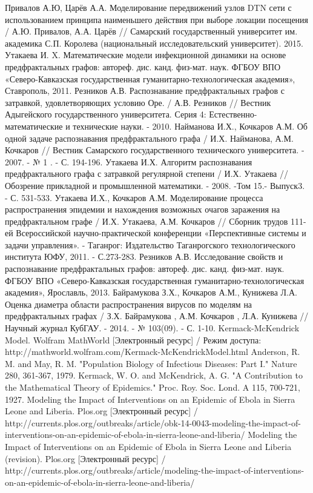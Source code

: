 \begin{thebibliography}{}
	 Привалов А.Ю, Царёв А.А. Моделирование передвижений узлов DTN сети с использованием принципа наименьшего действия при выборе локации посещения / А.Ю. Привалов, А.А. Царёв // Самарский государственный университет им. академика С.П. Королева (национальный исследовательский университет). 2015.
	Утакаева И. X. Математические модели	инфекционной динамики	на основе	предфрактальных графов: автореф. дис.  канд. физ-мат. наук.  ФГБОУ ВПО «Северо-Кавказская	государственная гуманитарно-технологическая академия», Ставрополь, 2011.
	Резников А.В. Распознавание предфрактальных графов с затравкой, удовлетворяющих условию Оре. / А.В. Резников // Вестник Адыгейского государственного университета. Серия 4: Естественно-математические и технические науки. - 2010.
	  Найманова И.Х., Кочкаров А.М. Об одной задаче распознавания предфрактального графа / И.Х. Найманова, А.М. Кочкаров // Вестник Самарского государственного технического университета. - 2007. - № 1 . - С. 194-196.
	Утакаева И.Х. Алгоритм распознавания предфрактального графа с затравкой регулярной степени / И.Х. Утакаева // Обозрение прикладной и промышленной математики. - 2008. -Том 15.- Выпуск3. - С. 531-533.
	Утакаева И.Х., Кочкаров А.М. Моделирование процесса распространения эпидемии и нахождения возможных очагов заражения на предфрактальном графе / И.Х. Утакаева, А.М. Кочкаров // Сборник трудов 111-ей Всероссийской научно-практической конференции «Перспективные системы и задачи управления». - Таганрог: Издательство Таганрогского технологического института ЮФУ, 2011. - С.273-283. 
	 Резников А.В. Исследование свойств и распознавание предфрактальных графов: автореф. дис.  канд. физ-мат. наук.  ФГБОУ ВПО «Северо-Кавказская	государственная гуманитарно-технологическая академия», Ярославль, 2013.
	 Байрамукова З.Х.,	Кочкаров А.М.,	Кунижева Л.А. Оценка диаметра области распространения вирусов по моделям на предфрактальных графах /   З.Х. Байрамукова ,	А.М. Кочкаров , Л.А. Кунижева //	Научный журнал КубГАУ. - 2014. - № 103(09). - С. 1-10.
	 Kermack-McKendrick Model. Wolfram MathWorld [Электронный ресурс] / Режим доступа: http://mathworld.wolfram.com/Kermack-McKendrickModel.html
	 Anderson, R. M. and May, R. M. "Population Biology of Infectious Diseases: Part I." Nature 280, 361-367, 1979.
	 Kermack, W. O. and McKendrick, A. G. "A Contribution to the Mathematical Theory of Epidemics." Proc. Roy. Soc. Lond. A 115, 700-721, 1927.
	 Modeling the Impact of Interventions on an Epidemic of Ebola in Sierra Leone and Liberia. Plos.org [Электронный ресурс] / http://currents.plos.org/outbreaks/article/obk-14-0043-modeling-the-impact-of-interventions-on-an-epidemic-of-ebola-in-sierra-leone-and-liberia/
	 Modeling the Impact of Interventions on an Epidemic of Ebola in Sierra Leone and Liberia (revision). Plos.org [Электронный ресурс] / http://currents.plos.org/outbreaks/article/modeling-the-impact-of-interventions-on-an-epidemic-of-ebola-in-sierra-leone-and-liberia/
\end{thebibliography}